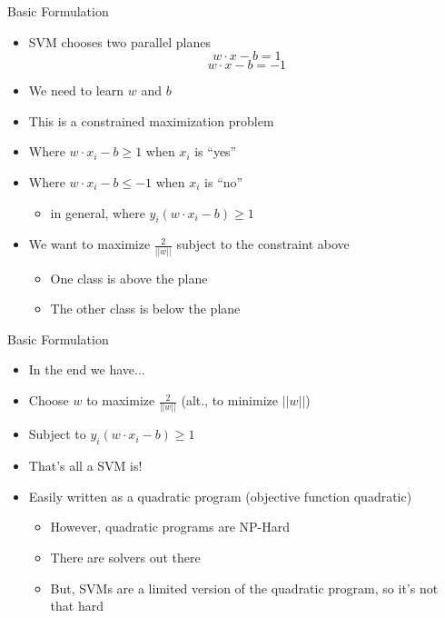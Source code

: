 \documentclass[aspectratio=169]{beamer}
\begin{document}
\begin{frame}{Basic Formulation}

\begin{itemize}
\item SVM chooses two parallel planes 
$$w \cdot x - b = 1$$ 
$$w \cdot x - b = -1$$
\item We need to learn $w$ and $b$
\item This is a constrained maximization problem
\item Where $w \cdot x_i - b \geq 1$ when $x_i$ is ``yes''
\item Where $w \cdot x_i - b \leq -1$ when $x_i$ is ``no''
	\begin{itemize}
	\item in general, where $y_i (w \cdot x_i - b) \geq 1$
	\end{itemize}
\item We want to maximize  $\frac{2}{||w||}$ subject to the constraint above
	\begin{itemize}
	\item One class is above the plane
	\item The other class is below the plane
	\end{itemize}
\end{itemize}
\end{frame}
\begin{frame}{Basic Formulation}

\begin{itemize}
\item In the end we have...
\item Choose $w$ to maximize $\frac{2}{||w||}$ (alt., to minimize $||w||$)
\item Subject to $y_i (w \cdot x_i - b) \geq 1$
\item That's all a SVM is!
\item Easily written as a quadratic program (objective function quadratic)
\begin{itemize}
\item However, quadratic programs are NP-Hard
\item There are solvers out there
\item But, SVMs are a limited version of the quadratic program, so it's not that hard
\end{itemize}
\end{itemize}
\end{frame}
\end{document}
